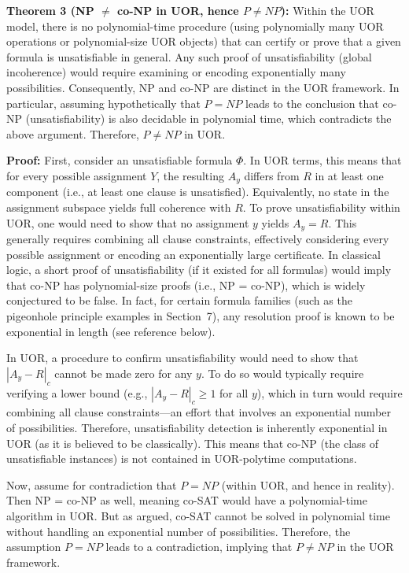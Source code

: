 \documentclass{article}
\begin{document}
\medskip
\textbf{Theorem 3 (NP $\neq$ co-NP in UOR, hence $P \neq NP$):} Within the UOR model, there is no polynomial-time procedure (using polynomially many UOR operations or polynomial-size UOR objects) that can certify or prove that a given formula is unsatisfiable in general. Any such proof of unsatisfiability (global incoherence) would require examining or encoding exponentially many possibilities. Consequently, NP and co-NP are distinct in the UOR framework. In particular, assuming hypothetically that $P=NP$ leads to the conclusion that co-NP (unsatisfiability) is also decidable in polynomial time, which contradicts the above argument. Therefore, $P \neq NP$ in UOR.

\medskip
\textbf{Proof:} First, consider an unsatisfiable formula $\Phi$. In UOR terms, this means that for every possible assignment $Y$, the resulting $A_y$ differs from $R$ in at least one component (i.e., at least one clause is unsatisfied). Equivalently, no state in the assignment subspace yields full coherence with $R$. To prove unsatisfiability within UOR, one would need to show that no assignment $y$ yields $A_y = R$. This generally requires combining all clause constraints, effectively considering every possible assignment or encoding an exponentially large certificate. In classical logic, a short proof of unsatisfiability (if it existed for all formulas) would imply that co-NP has polynomial-size proofs (i.e., NP = co-NP), which is widely conjectured to be false. In fact, for certain formula families (such as the pigeonhole principle examples in Section~7), any resolution proof is known to be exponential in length (see reference below).

In UOR, a procedure to confirm unsatisfiability would need to show that $|A_y - R|_c$ cannot be made zero for any $y$. To do so would typically require verifying a lower bound (e.g., $|A_y - R|_c \ge 1$ for all $y$), which in turn would require combining all clause constraints—an effort that involves an exponential number of possibilities. Therefore, unsatisfiability detection is inherently exponential in UOR (as it is believed to be classically). This means that co-NP (the class of unsatisfiable instances) is not contained in UOR-polytime computations.

Now, assume for contradiction that $P=NP$ (within UOR, and hence in reality). Then NP = co-NP as well, meaning co-SAT would have a polynomial-time algorithm in UOR. But as argued, co-SAT cannot be solved in polynomial time without handling an exponential number of possibilities. Therefore, the assumption $P=NP$ leads to a contradiction, implying that $P \neq NP$ in the UOR framework.
\end{document}
